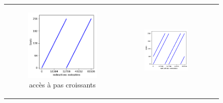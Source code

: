 \begin{figure}
\begin{tabular}{c c c}
		\begin{subfigure}[t]{0.3\linewidth}
			\includegraphics[width=\linewidth]{graphics/figures/pattern-quad-32.pdf}
			\caption{\label{fig:pattern-visual-quad}accès à pas croissants}
		\end{subfigure} &
		\begin{subfigure}[t]{0.3\linewidth}
			\includegraphics[width=\linewidth]{graphics/figures/pattern-strided-quad-32.pdf}

\end{subfigure}
\end{tabular}
\end{figure}
